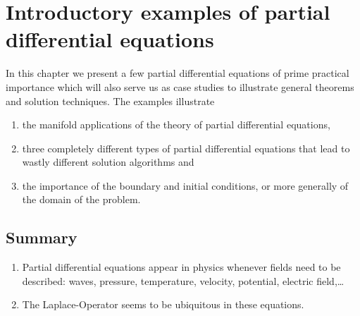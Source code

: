 %
%
%
\chapter{Introductory examples of partial differential equations
\label{chapter:examples}}
In this chapter we present a few partial differential equations
of prime practical importance which will also serve us as case
studies to illustrate general theorems and solution techniques.
The examples illustrate
\begin{enumerate}
\item
the manifold applications of the theory of partial differential equations,
\item
three completely different types of partial differential equations
that lead to wastly different solution algorithms and
\item
the importance of the boundary and initial conditions, or more generally
of the domain of the problem.
\end{enumerate}








\section{Summary\label{examples:summary}}
\begin{enumerate}
\item 
Partial differential equations appear in physics whenever fields need
to be described: waves, pressure, temperature, velocity, potential,
electric field,\;\dots
\item
The Laplace-Operator seems to be ubiquitous in these equations.
\end{enumerate}
